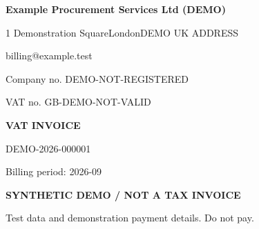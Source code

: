 \documentclass[10pt,a4paper]{article}
\begin{document}
\color{ink}
\raggedright
\begin{minipage}[t]{0.57\textwidth}
\vspace{0pt}
{\Large\bfseries Example Procurement Services Ltd (DEMO)}\par
{\small 1 Demonstration Square\newline{}London\newline{}DEMO UK ADDRESS\par
billing@example.test\par
Company no. DEMO-NOT-REGISTERED

\par VAT no. GB-DEMO-NOT-VALID

}
\end{minipage}\hfill
\begin{minipage}[t]{0.39\textwidth}\raggedleft
\vspace{0pt}
{\Huge\bfseries VAT INVOICE}\par
{\large DEMO-2026-000001}\par
{\small\color{muted}Billing period: 2026-09}
\end{minipage}
\par\vspace{5mm}

\colorbox{pale}{\parbox{\dimexpr\textwidth-2\fboxsep\relax}{\centering\small\bfseries\color{demo}SYNTHETIC DEMO / NOT A TAX INVOICE\par\normalfont\footnotesize Test data and demonstration payment details. Do not pay.}}
\vspace{4mm}
\end{document}
